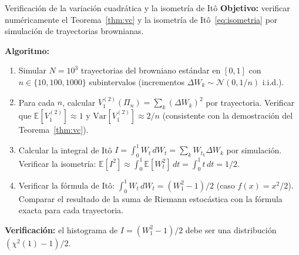 \begin{ejerciciocomp}{Verificación de la variación cuadrática y la isometría de Itô}
\textbf{Objetivo:} verificar numéricamente el Teorema~\ref{thm:vc} y la
isometría de Itô~\eqref{eq:isometria} por simulación de trayectorias brownianas.

\medskip\noindent\textbf{Algoritmo:}
\begin{enumerate}
  \item Simular $N = 10^3$ trayectorias del browniano estándar en $[0,1]$
        con $n \in \{10, 100, 1000\}$ subintervalos (incrementos
        $\Delta W_k \sim \mathcal{N}(0, 1/n)$ i.i.d.).
  \item Para cada $n$, calcular $V_1^{(2)}(\Pi_n) = \sum_k(\Delta W_k)^2$
        por trayectoria. Verificar que $\mathbb{E}[V_1^{(2)}] \approx 1$ y
        $\mathrm{Var}[V_1^{(2)}] \approx 2/n$ (consistente con la demostración
        del Teorema~\ref{thm:vc}).
  \item Calcular la integral de Itô $I = \int_0^1 W_t\,dW_t = \sum_k W_{t_k}\Delta W_k$
        por simulación. Verificar la isometría: $\mathbb{E}[I^2] \approx
        \int_0^1 \mathbb{E}[W_t^2]\,dt = \int_0^1 t\,dt = 1/2$.
  \item Verificar la fórmula de Itô: $\int_0^1 W_t\,dW_t = (W_1^2 - 1)/2$
        (caso $f(x) = x^2/2$). Comparar el resultado de la suma de Riemann
        estocástica con la fórmula exacta para cada trayectoria.
\end{enumerate}
\medskip\noindent\textbf{Verificación:} el histograma de $I = (W_1^2-1)/2$
debe ser una distribución $(\chi^2(1) - 1)/2$.
\end{ejerciciocomp}


